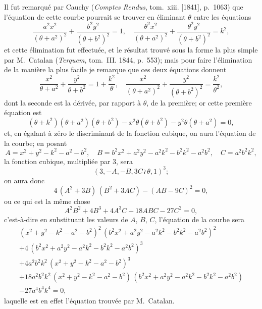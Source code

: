 \documentclass[11pt,a4paper]{book}
\begin{document}
Il fut remarqu\'{e} par Cauchy (\textit{Comptes Rendus}, tom.~xiii. [1841], p.~1063) que l'\'{e}quation de cette courbe pourrait se trouver en \'{e}liminant $\theta$ entre les \'{e}quations
\[
\frac{a^2x^2}{(\theta+a^2)^2} + \frac{b^2y^2}{(\theta+b^2)^2} = 1, \quad
\frac{\theta^2 x^2}{(\theta+a^2)^2} + \frac{\theta^2 y^2}{(\theta+b^2)^2} = k^2,
\]
et cette \'{e}limination fut effectu\'{e}e, et le r\'{e}sultat trouv\'{e} sous la forme la plus simple par M.~Catalan (\textit{Terquem}, tom.~III. 1844, p.~553); mais pour faire l'\'{e}limination de la mani\`{e}re la plus facile je remarque que ces deux \'{e}quations donnent
\[
\frac{x^2}{\theta+a^2} + \frac{y^2}{\theta+b^2} = 1 + \frac{k^2}{\theta}, \quad
\frac{x^2}{(\theta+a^2)^2} + \frac{y^2}{(\theta+b^2)^2} = \frac{k^2}{\theta^2},
\]
dont la seconde est la d\'{e}riv\'{e}e, par rapport \`{a} $\theta$, de la premi\`{e}re; or cette premi\`{e}re \'{e}quation est
\[
(\theta+k^2)(\theta+a^2)(\theta+b^2) - x^2\theta(\theta+b^2) - y^2\theta(\theta+a^2) = 0,
\]
et, en \'{e}galant \`{a} z\'{e}ro le discriminant de la fonction cubique, on aura l'\'{e}quation de la courbe; en posant
\[
A = x^2 + y^2 - k^2 - a^2 - b^2, \quad
B = b^2x^2 + a^2y^2 - a^2k^2 - b^2k^2 - a^2b^2, \quad
C = a^2b^2k^2,
\]
la fonction cubique, multipli\'{e}e par 3, sera
\[
(3, -A, -B, 3C\,\wr\,\theta, 1)^3;
\]
on aura donc
\[
4\,(A^2 + 3B)\,(B^2 + 3AC) - (AB - 9C)^2 = 0,
\]
ou ce qui est la m\^{e}me chose
\[
A^2B^2 + 4B^3 + 4A^3C + 18ABC - 27C^2 = 0,
\]
c'est-\`{a}-dire en substituant les valeurs de $A$, $B$, $C$, l'\'{e}quation de la courbe sera
\begin{multline*}
(x^2 + y^2 - k^2 - a^2 - b^2)^2\,(b^2x^2 + a^2y^2 - a^2k^2 - b^2k^2 - a^2b^2)^2 \\
+ 4\,(b^2x^2 + a^2y^2 - a^2k^2 - b^2k^2 - a^2b^2)^3 \\
+ 4a^2b^2k^2\,(x^2 + y^2 - k^2 - a^2 - b^2)^3 \\
+ 18a^2b^2k^2\,(x^2 + y^2 - k^2 - a^2 - b^2)\,(b^2x^2 + a^2y^2 - a^2k^2 - b^2k^2 - a^2b^2) \\
- 27a^4b^4k^4 = 0,
\end{multline*}
laquelle est en effet l'\'{e}quation trouv\'{e}e par M.~Catalan.
\end{document}
